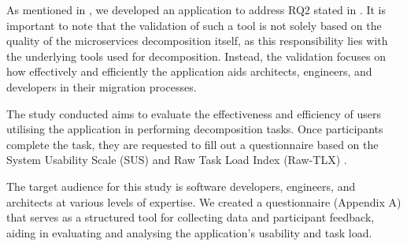 As mentioned in , we developed an application to address
RQ2 stated in . It is important to note that the
validation of such a tool is not solely based on the quality of the
microservices decomposition itself, as this responsibility lies with the
underlying tools used for decomposition. Instead, the validation focuses on how
effectively and efficiently the application aids architects, engineers, and
developers in their migration processes.

The study conducted aims to evaluate the effectiveness and efficiency of users
utilising the application in performing decomposition tasks. Once participants
complete the task, they are requested to fill out a questionnaire based on the
System Usability Scale (SUS) \cite{brooke1996sus} and Raw Task Load Index
(Raw-TLX) \cite{hart2006nasa}.

The target audience for this study is software developers, engineers, and
architects at various levels of expertise. We created a questionnaire (Appendix
A) that serves as a structured tool for collecting data and participant
feedback, aiding in evaluating and analysing the application's usability and
task load.
